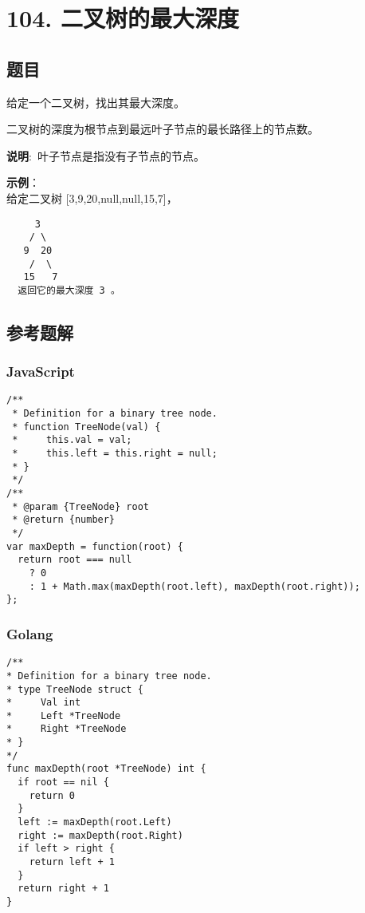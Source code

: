 \newpage
\section{104. 二叉树的最大深度}
\label{leetcode:104}

\subsection{题目}

给定一个二叉树，找出其最大深度。

二叉树的深度为根节点到最远叶子节点的最长路径上的节点数。

\textbf{说明}: 叶子节点是指没有子节点的节点。

\textbf{示例}：\\
给定二叉树 [3,9,20,null,null,15,7]，

\begin{verbatim}
     3
    / \
   9  20
    /  \
   15   7
  返回它的最大深度 3 。
\end{verbatim}

\subsection{参考题解}

\subsubsection{JavaScript}

\begin{verbatim}
/**
 * Definition for a binary tree node.
 * function TreeNode(val) {
 *     this.val = val;
 *     this.left = this.right = null;
 * }
 */
/**
 * @param {TreeNode} root
 * @return {number}
 */
var maxDepth = function(root) {
  return root === null
    ? 0
    : 1 + Math.max(maxDepth(root.left), maxDepth(root.right));
};
\end{verbatim}

\subsubsection{Golang}

\begin{verbatim}
/**
* Definition for a binary tree node.
* type TreeNode struct {
*     Val int
*     Left *TreeNode
*     Right *TreeNode
* }
*/
func maxDepth(root *TreeNode) int {
  if root == nil {
    return 0
  }
  left := maxDepth(root.Left)
  right := maxDepth(root.Right)
  if left > right {
    return left + 1
  }
  return right + 1
}
\end{verbatim}
